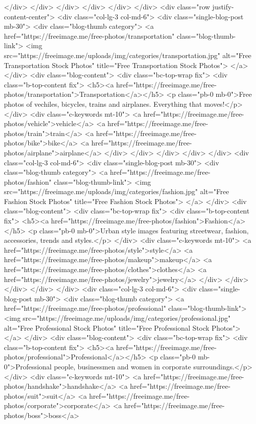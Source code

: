 </div>
</div>
</div>
</div>
</div>
</div>
<div class="row justify-content-center">
<div class="col-lg-3 col-md-6">
<div class="single-blog-post mb-30">
<div class="blog-thumb category">
<a href="https://freeimage.me/free-photos/transportation" class="blog-thumb-link">
<img src="https://freeimage.me/uploads/img/categories/transportation.jpg" alt="Free Transportation Stock Photos" title="Free Transportation Stock Photos">
</a>
</div>
<div class="blog-content">
<div class="bc-top-wrap fix">
<div class="b-top-content fix">
<h5><a href="https://freeimage.me/free-photos/transportation">Transportation</a></h5>
<p class="pb-0 mb-0">Free photos of vechiles, bicycles, trains and airplanes. Everything that moves!</p>
</div>
<div class="c-keywords mt-10">
<a href="https://freeimage.me/free-photos/vehicle">vehicle</a> <a href="https://freeimage.me/free-photos/train">train</a> <a href="https://freeimage.me/free-photos/bike">bike</a> <a href="https://freeimage.me/free-photos/airplane">airplane</a>
</div>
</div>
</div>
</div>
</div>
<div class="col-lg-3 col-md-6">
<div class="single-blog-post mb-30">
<div class="blog-thumb category">
<a href="https://freeimage.me/free-photos/fashion" class="blog-thumb-link">
<img src="https://freeimage.me/uploads/img/categories/fashion.jpg" alt="Free Fashion Stock Photos" title="Free Fashion Stock Photos">
</a>
</div>
<div class="blog-content">
<div class="bc-top-wrap fix">
<div class="b-top-content fix">
<h5><a href="https://freeimage.me/free-photos/fashion">Fashion</a></h5>
<p class="pb-0 mb-0">Urban style images featuring streetwear, fashion, accessories, trends and styles.</p>
</div>
<div class="c-keywords mt-10">
 <a href="https://freeimage.me/free-photos/style">style</a> <a href="https://freeimage.me/free-photos/makeup">makeup</a> <a href="https://freeimage.me/free-photos/clothes">clothes</a> <a href="https://freeimage.me/free-photos/jewelry">jewelry</a>
</div>
</div>
</div>
</div>
</div>
<div class="col-lg-3 col-md-6">
<div class="single-blog-post mb-30">
<div class="blog-thumb category">
<a href="https://freeimage.me/free-photos/professional" class="blog-thumb-link">
<img src="https://freeimage.me/uploads/img/categories/professional.jpg" alt="Free Professional Stock Photos" title="Free Professional Stock Photos">
</a>
</div>
<div class="blog-content">
<div class="bc-top-wrap fix">
<div class="b-top-content fix">
<h5><a href="https://freeimage.me/free-photos/professional">Professional</a></h5>
<p class="pb-0 mb-0">Professional people, businessmen and women in corporate surroundings.</p>
</div>
<div class="c-keywords mt-10">
<a href="https://freeimage.me/free-photos/handshake">handshake</a> <a href="https://freeimage.me/free-photos/suit">suit</a> <a href="https://freeimage.me/free-photos/corporate">corporate</a> <a href="https://freeimage.me/free-photos/boss">boss</a>
